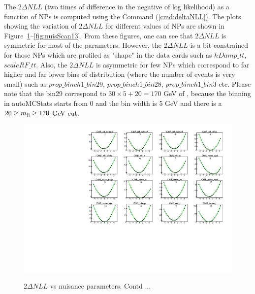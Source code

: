 The $2\Delta NLL$ (two times of difference in the negative of log likelihood) 
as a function of NPs is computed using the Command (\ref{cmd:deltaNLL}).
The plots showing the variation of $2\Delta NLL$ for different values of NPs 
are shown in Figure~\ref{fig:nuisScan1}--\ref{fig:nuisScan13}. From these figures, 
one can see that $2\Delta NLL$ is symmetric for most of the parameters. However, 
the $2\Delta NLL$ is a bit constrained for those NPs which are profiled as 
"shape" in the data cards such as $hDamp\_tt$, $scaleRF\_tt$. Also, the $2\Delta 
NLL$ is asymmetric for few NPs which correspond to far higher and far lower bins 
of \mjj distribution (where the number of events is very small) such as 
$prop\_binch1\_bin29$, $prop\_binch1\_bin28$, $prop\_binch1\_bin3$ etc. Please 
note that the bin29 correspond to $30\times 5 + 20 = 170$ GeV of \mjj, 
because the binning in autoMCStats starts from 0 and the bin width is 5 GeV and 
there is a $20 \geq m_\text{jj} \geq 170$ GeV cut.

\newpage
\begin{figure}
    \centering  
    {\includegraphics[width=1.0\linewidth]{Image/MLFit/ScanNuis/scanNuis1.pdf}}
    \caption{  $2\Delta NLL$ vs nuisance parameters. Contd ...}
    \label{fig:nuisScan1}
\end{figure}


